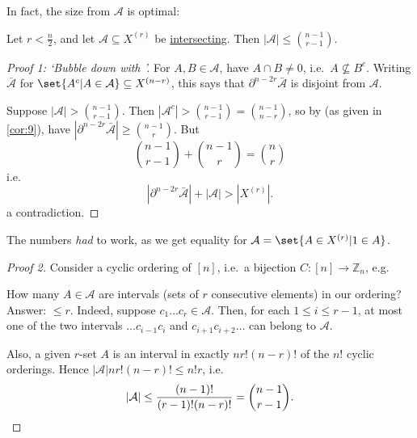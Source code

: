 \documentclass{article}
\newcommand{\A}{\mathcal{A}}
\let\subset\subseteq
\begin{document}
In fact, the size from $\A$ is optimal:
\begin{nthm}\label{thm:ekr11}
  Let $r < \frac{n}{2}$, and let $\A \subset X^{(r)}$ be \hyperlink{def:inter}{intersecting}.
  Then $|\A| \leq \binom{n-1}{r-1}$.
\end{nthm}
\begin{proof}[Proof 1: `Bubble down with ']
  For $A,B \in \A$, have $A \cap B \neq 0$, i.e.\ $A \nsubseteq B^c$.
  Writing $\bar{\A}$ for $\set{A^c | A \in \A} \subset X^{(n-r)}$, this says that $\partial^{n-2r} \bar{\A}$ is disjoint from $\A$.

  Suppose $|\A| > \binom{n-1}{r-1}$.
  Then $|\A^c| > \binom{n-1}{r-1} = \binom{n-1}{n-r}$, so by  (as given in \cref{cor:9}), have $|\partial^{n-2r} \bar{\A}| \geq \binom{n-1}{r}$.
  But
  \begin{equation*}
    \binom{n-1}{r-1} + \binom{n-1}{r} = \binom{n}{r}
  \end{equation*}
  i.e.\
  \begin{equation*}
    |\partial^{n-2r} \bar{\A}| + |\A| > |X^{(r)}|.
  \end{equation*}
  a contradiction.
\end{proof}
\begin{remark}
  The numbers \emph{had} to work, as we get equality for $\A = \set{A \in X^{(r)} | 1 \in A}$.
\end{remark}
\begin{proof}[Proof 2]
  Consider a cyclic ordering of $[n]$, i.e.\ a bijection $C: [n] \to \mathbb{Z}_n$, e.g.
  \begin{center}
  \end{center}
  How many $A \in \A$ are intervals (sets of $r$ consecutive elements) in our ordering?
  Answer: $\leq r$. Indeed, suppose $c_1 \dots c_r \in \mathcal{A}$.
  Then, for each $1 \leq i \leq r-1$, at most one of the two intervals $\dots c_{i-1} c_i$ and $c_{i+1} c_{i+2} \dots$ can belong to $\A$.

  Also, a given $r$-set $A$ is an interval in exactly $n r! (n-r)!$ of the $n!$ cyclic orderings.
  Hence $|\A| n r! (n-r)! \leq n! r$, i.e.
  \begin{equation*}
    |\A| \leq \frac{(n-1)!}{(r-1)! (n-r)!} = \binom{n-1}{r-1}. \qedhere
  \end{equation*}
\end{proof}
\end{document}
